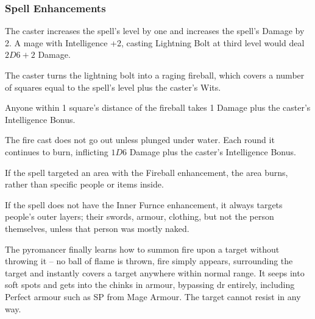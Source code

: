 \documentclass[titlepage,a4paper,openany]{book}
\begin{document}
\begin{multicols}{2}
\subsubsection{Spell Enhancements}

 The caster increases the spell's level by one and increases the spell's Damage by 2.  A mage with Intelligence +2, casting Lightning Bolt at third level would deal $2D6+2$ Damage.

 The caster turns the lightning bolt into a raging fireball, which covers a number of squares equal to the spell's level plus the caster's Wits.

Anyone within 1 square's distance of the fireball takes 1 Damage plus the caster's Intelligence Bonus.

 The fire cast does not go out unless plunged under water.  Each \gls{round} it continues to burn, inflicting $1D6$ Damage plus the caster's Intelligence Bonus.

If the spell targeted an area with the Fireball enhancement, the area burns, rather than specific people or items inside.

If the spell does not have the Inner Furnce enhancement, it always targets people's outer layers; their swords, armour, clothing, but not the person themselves, unless that person was mostly naked.

 The pyromancer finally learns how to summon fire upon a target without throwing it -- no ball of flame is thrown, fire simply appears, surrounding the target and instantly covers a target anywhere within normal range. It seeps into soft spots and gets into the chinks in armour, bypassing \gls{dr} entirely, including Perfect armour such as \gls{SP} from Mage Armour. The target cannot resist in any way.

\end{multicols}

\end{document}
